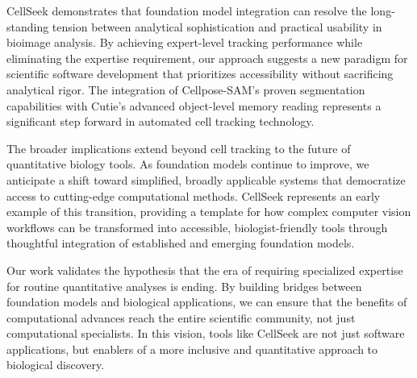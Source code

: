 \documentclass[12pt]{article}
\begin{document}
CellSeek demonstrates that foundation model integration can resolve the long-standing tension between analytical sophistication and practical usability in bioimage analysis. By achieving expert-level tracking performance while eliminating the expertise requirement, our approach suggests a new paradigm for scientific software development that prioritizes accessibility without sacrificing analytical rigor. The integration of Cellpose-SAM's proven segmentation capabilities with Cutie's advanced object-level memory reading represents a significant step forward in automated cell tracking technology.

The broader implications extend beyond cell tracking to the future of quantitative biology tools. As foundation models continue to improve, we anticipate a shift toward simplified, broadly applicable systems that democratize access to cutting-edge computational methods. CellSeek represents an early example of this transition, providing a template for how complex computer vision workflows can be transformed into accessible, biologist-friendly tools through thoughtful integration of established and emerging foundation models.

Our work validates the hypothesis that the era of requiring specialized expertise for routine quantitative analyses is ending. By building bridges between foundation models and biological applications, we can ensure that the benefits of computational advances reach the entire scientific community, not just computational specialists. In this vision, tools like CellSeek are not just software applications, but enablers of a more inclusive and quantitative approach to biological discovery.
\end{document}

